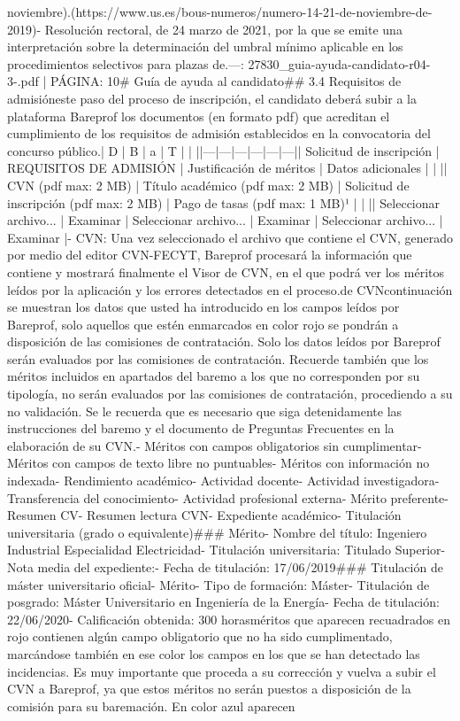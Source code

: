 \documentclass{article}
\begin{document}
\begin{itemize}
{{noviembre).(https://www.us.es/bous-numeros/numero-14-21-de-noviembre-de-2019)\n\n- Resolución rectoral, de 24 marzo de 2021, por la que se emite una interpretación sobre la determinación del umbral mínimo aplicable en los procedimientos selectivos para plazas de.\n\n---\n\nFUENTE: 27830_guia-ayuda-candidato-r04-3-.pdf | PÁGINA: 10\n# Guía de ayuda al candidato\n\n## 3.4 Requisitos de admisión\n\nEn este paso del proceso de inscripción, el candidato deberá subir a la plataforma Bareprof los documentos (en formato pdf) que acreditan el cumplimiento de los requisitos de admisión establecidos en la convocatoria del concurso público.\n\n| D | B | a | T | | |\n|---|---|---|---|---|---|\n| Solicitud de inscripción | REQUISITOS DE ADMISIÓN | Justificación de méritos | Datos adicionales | | |\n| CVN (pdf max: 2 MB) | Título académico (pdf max: 2 MB) | Solicitud de inscripción (pdf max: 2 MB) | Pago de tasas (pdf max: 1 MB)¹ | | |\n| Seleccionar archivo... | Examinar | Seleccionar archivo... | Examinar | Seleccionar archivo... | Examinar |\n\n- CVN: Una vez seleccionado el archivo que contiene el CVN, generado por medio del editor CVN-FECYT, Bareprof procesará la información que contiene y mostrará finalmente el Visor de CVN, en el que podrá ver los méritos leídos por la aplicación y los errores detectados en el proceso.\n\nVisor de CVN\n\nA continuación se muestran los datos que usted ha introducido en los campos leídos por Bareprof, solo aquellos que estén enmarcados en color rojo se pondrán a disposición de las comisiones de contratación. Solo los datos leídos por Bareprof serán evaluados por las comisiones de contratación. Recuerde también que los méritos incluidos en apartados del baremo a los que no corresponden por su tipología, no serán evaluados por las comisiones de contratación, procediendo a su no validación. Se le recuerda que es necesario que siga detenidamente las instrucciones del baremo y el documento de Preguntas Frecuentes en la elaboración de su CVN.\n\n- Méritos con campos obligatorios sin cumplimentar\n- Méritos con campos de texto libre no puntuables\n- Méritos con información no indexada\n\n- Rendimiento académico\n- Actividad docente\n- Actividad investigadora\n- Transferencia del conocimiento\n- Actividad profesional externa\n- Mérito preferente\n- Resumen CV\n- Resumen lectura CVN\n- Expediente académico\n- Titulación universitaria (grado o equivalente)\n\n### Mérito\n\n- Nombre del título: Ingeniero Industrial Especialidad Electricidad\n- Titulación universitaria: Titulado Superior\n- Nota media del expediente:\n- Fecha de titulación: 17/06/2019\n\n### Titulación de máster universitario oficial\n\n- Mérito\n- Tipo de formación: Máster\n- Titulación de posgrado: Máster Universitario en Ingeniería de la Energía\n- Fecha de titulación: 22/06/2020\n- Calificación obtenida: 300 horas\n\nLos méritos que aparecen recuadrados en rojo contienen algún campo obligatorio que no ha sido cumplimentado, marcándose también en ese color los campos en los que se han detectado las incidencias. Es muy importante que proceda a su corrección y vuelva a subir el CVN a Bareprof, ya que estos méritos no serán puestos a disposición de la comisión para su baremación. En color azul aparecen }}
\end{itemize}
\end{document}
